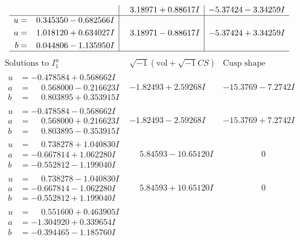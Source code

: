 \documentclass[1p]{elsarticle_modified}
\theoremstyle{definition}
\newcommand{\I}{\sqrt{-1}}
\begin{document}
$$\begin{array}{c|c|c}
 & \phantom{-}3.18971 + 0.88617 I & -5.37424 - 3.34259 I \\ \hline\begin{aligned}
u &= \phantom{-}0.345350 - 0.682566 I \\
a &= \phantom{-}1.018120 + 0.634027 I \\
b &= \phantom{-}0.044806 - 1.135950 I\end{aligned}
 & \phantom{-}3.18971 - 0.88617 I & -5.37424 + 3.34259 I\\
 \hline 
 \end{array}$$\newpage$$\begin{array}{c|c|c}  
\text{Solutions to }I^u_{1}& \I (\text{vol} + \sqrt{-1}CS) & \text{Cusp shape}\\
 \hline 
\begin{aligned}
u &= -0.478584 + 0.568662 I \\
a &= \phantom{-}0.568000 - 0.216623 I \\
b &= \phantom{-}0.803895 + 0.353915 I\end{aligned}
 & -1.82493 + 2.59268 I & -15.3769 - 7.2742 I \\ \hline\begin{aligned}
u &= -0.478584 - 0.568662 I \\
a &= \phantom{-}0.568000 + 0.216623 I \\
b &= \phantom{-}0.803895 - 0.353915 I\end{aligned}
 & -1.82493 - 2.59268 I & -15.3769 + 7.2742 I \\ \hline\begin{aligned}
u &= \phantom{-}0.738278 + 1.040830 I \\
a &= -0.667814 + 1.062280 I \\
b &= -0.552812 - 1.199040 I\end{aligned}
 & \phantom{-}5.84593 - 10.65120 I & \phantom{-0.000000 } 0 \\ \hline\begin{aligned}
u &= \phantom{-}0.738278 - 1.040830 I \\
a &= -0.667814 - 1.062280 I \\
b &= -0.552812 + 1.199040 I\end{aligned}
 & \phantom{-}5.84593 + 10.65120 I & \phantom{-0.000000 } 0 \\ \hline\begin{aligned}
u &= \phantom{-}0.551600 + 0.463905 I \\
a &= -1.304920 + 0.339654 I \\
b &= -0.394465 - 1.185760 I\end{aligned}

\end{array}$$
\end{document}

